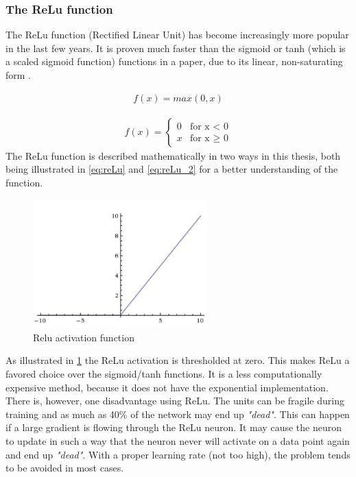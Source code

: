 \documentclass[USenglish]{ifimaster}  %
\begin{document}
\subsubsection{The ReLu function}
The ReLu function (Rectified Linear Unit) has become increasingly more popular in the last few years. It is proven much faster than the sigmoid or tanh (which is a scaled sigmoid function) functions in a paper, due to its linear, non-saturating form \cite{website:relu}. 

\begin{equation}\label{eq:reLu}
\begin{aligned}
f(x) = max(0,x)
\end{aligned}
\end{equation}

\begin{equation}\label{eq:reLu_2}
\begin{aligned}
{f(x) = 
\begin{cases}
    0 & \text{for x < 0}  \\
    x & \text{for x $\geq$ 0}
\end{cases}}
\end{aligned}
\end{equation}
The ReLu function is described mathematically in two ways in this thesis, both being illustrated in \cref{eq:reLu} and \cref{eq:reLu_2} for a better understanding of the function.

\begin{figure}[ht]
    \centering
    \includegraphics[width=0.6\textwidth]{bilder/relu_activation.png}
    \caption{Relu activation function \cite{website:cs231n_activation_functions}}
    \label{fig:relu}
\end{figure}
As illustrated in \cref{fig:relu} the ReLu activation is thresholded at zero. This makes ReLu a favored choice over the sigmoid/tanh functions. It is a less computationally expensive method, because it does not have the exponential implementation. There is, however, one disadvantage using ReLu. The units can be fragile during training and as much as 40\% of the network may end up \textit{"dead"}. This can happen if a large gradient is flowing through the ReLu neuron. It may cause the neuron to update in such a way that the neuron never will activate on a data point again and end up \textit{"dead"}. With a proper learning rate (not too high), the problem tends to be avoided in most cases.
\end{document}
